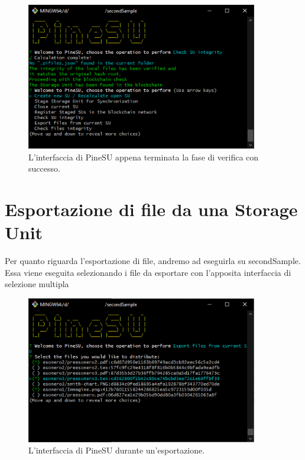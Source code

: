 \begin{figure}[H]
    \centering
    \includegraphics[width=0.9\textwidth]{Figures/verify}
    \caption{\small{
    L’interfaccia di PineSU appena terminata la fase di verifica con successo.
    } %
    } %
    \label{fi:ver}
\end{figure}
\newpage

\section{Esportazione di file da una Storage Unit}
\label{sub:exp}
Per quanto riguarda l’esportazione di file, andremo ad eseguirla su \textsf{secondSample}.
Essa viene eseguita selezionando i file da esportare con l’apposita interfaccia
di selezione multipla
\begin{figure}[H]
    \centering
    \includegraphics[width=0.9\textwidth]{Figures/export}
    \caption{\small{
    L’interfaccia di PineSU durante un’esportazione.
    } %
    } %
    \label{fi:exp}
\end{figure}

